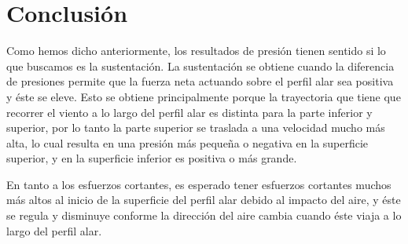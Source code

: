 \documentclass[12pt, letterpaper]{article}
\begin{document}
\section*{Conclusión}

Como hemos dicho anteriormente, los resultados de presión tienen sentido si lo que buscamos es la sustentación. La sustentación se obtiene cuando la diferencia de presiones permite que la fuerza neta actuando sobre el perfil alar sea positiva y éste se eleve. Esto se obtiene principalmente porque la trayectoria que tiene que recorrer el viento a lo largo del perfil alar es distinta para la parte inferior y superior, por lo tanto la parte superior se traslada a una velocidad mucho más alta, lo cual resulta en una presión más pequeña o negativa en la superficie superior, y en la superficie inferior es positiva o más grande.

En tanto a los esfuerzos cortantes, es esperado tener esfuerzos cortantes muchos más altos al inicio de la superficie del perfil alar debido al impacto del aire, y éste se regula y disminuye conforme la dirección del aire cambia cuando éste viaja a lo largo del perfil alar.
\renewcommand\refname{References}
\printbibliography
\end{document}
